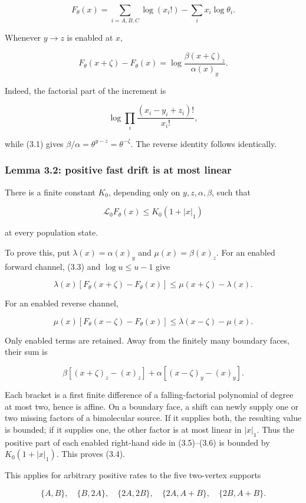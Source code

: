 \[
 F_\theta(x)=\sum_{i=A,B,C}\log(x_i!)
              -\sum_i x_i\log\theta_i.
\tag{3.2}
\]

Whenever \(y\to z\) is enabled at \(x\),

\[
 F_\theta(x+\zeta)-F_\theta(x)
 =\log\frac{\beta(x+\zeta)_z}{\alpha(x)_y}.
\tag{3.3}
\]

Indeed, the factorial part of the increment is

\[
 \log\prod_i\frac{(x_i-y_i+z_i)!}{x_i!},
\]

while (3.1) gives \(\beta/\alpha=\theta^{y-z}=\theta^{-\zeta}\). The
reverse identity follows identically.

\subsubsection{Lemma 3.2: positive fast drift is at most
linear}

There is a finite constant \(K_0\), depending only on
\(y,z,\alpha,\beta\), such that

\[
 \mathcal L_0F_\theta(x)\le K_0(1+|x|_1)
\tag{3.4}
\]

at every population state.

To prove this, put \(\lambda(x)=\alpha(x)_y\) and \(\mu(x)=\beta(x)_z\).
For an enabled forward channel, (3.3) and \(\log u\le u-1\) give

\[
 \lambda(x)[F_\theta(x+\zeta)-F_\theta(x)]
 \le \mu(x+\zeta)-\lambda(x).
\tag{3.5}
\]

For an enabled reverse channel,

\[
 \mu(x)[F_\theta(x-\zeta)-F_\theta(x)]
 \le \lambda(x-\zeta)-\mu(x).
\tag{3.6}
\]

Only enabled terms are retained. Away from the finitely many boundary
faces, their sum is

\[
 \beta[(x+\zeta)_z-(x)_z]
 +\alpha[(x-\zeta)_y-(x)_y].
\tag{3.7}
\]

Each bracket is a first finite difference of a falling-factorial
polynomial of degree at most two, hence is affine. On a boundary face, a
shift can newly supply one or two missing factors of a bimolecular
source. If it supplies both, the resulting value is bounded; if it
supplies one, the other factor is at most linear in \(|x|_1\). Thus the
positive part of each enabled right-hand side in (3.5)--(3.6) is bounded
by \(K_0(1+|x|_1)\). This proves (3.4).

This applies for arbitrary positive rates to the five two-vertex
supports

\[
 \{A,B\},\quad\{B,2A\},\quad\{2A,2B\},\quad
 \{2A,A+B\},\quad\{2B,A+B\}.
\tag{3.8}
\]

